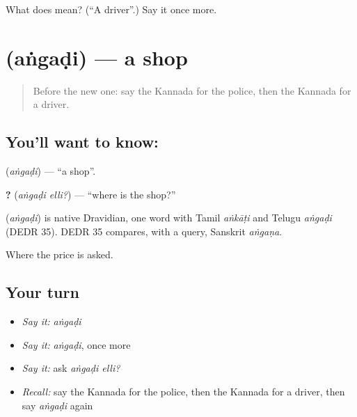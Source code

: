 \begin{tcolorbox}[breakable,colback=teal!4,colframe=teal!35!black,title={Before you move on}]
What does  mean? (\textquotedblleft{}A driver\textquotedblright{}.) Say it once more.
\end{tcolorbox}
\section[\texorpdfstring{\kn{ಅಂಗಡಿ} (aṅgaḍi)}{ಅಂಗಡಿ (aṅgaḍi)}]{ (aṅgaḍi) — a shop}

\label{lesson:KA-C104-shop}



\begin{quote}
Before the new one: say the Kannada for the police, then the Kannada for a driver.
\end{quote}

\subsection*{You'll want to know: }
\textbf{} (\emph{aṅgaḍi}) — \textquotedblleft{}a shop\textquotedblright{}.

\textbf{ ?} (\emph{aṅgaḍi elli?}) — \textquotedblleft{}where is the shop?\textquotedblright{}

\begin{cousinweb}
\textbf{} (\emph{aṅgaḍi}) is native Dravidian, one word with Tamil \emph{aṅkāṭi} and Telugu \emph{aṅgaḍi} (DEDR 35). DEDR 35 compares, with a query, Sanskrit \emph{aṅgaṇa}.
\end{cousinweb}

\begin{grammarlens}[title={What you've built}]
Where the price is asked.
\end{grammarlens}

\subsection*{Your turn}
\begin{itemize}
\raggedright
  \item \emph{Say it:} \emph{aṅgaḍi}
  \item \emph{Say it:} \emph{aṅgaḍi}, once more
  \item \emph{Say it:} ask \emph{aṅgaḍi elli?}
  \item \emph{Recall:} say the Kannada for the police, then the Kannada for a driver, then say \emph{aṅgaḍi} again
\end{itemize}

